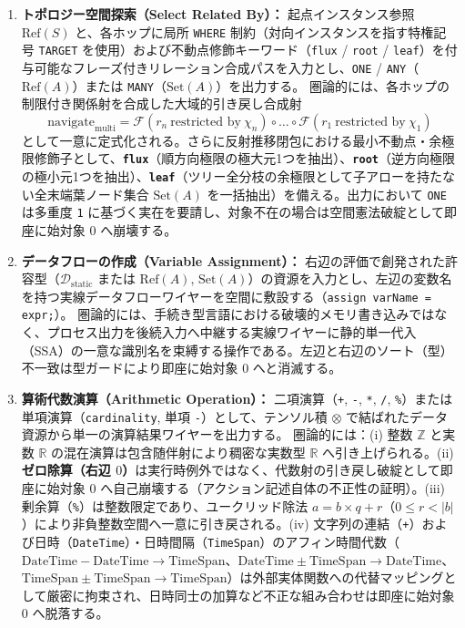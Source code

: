 \documentclass[11pt,a4paper]{ltjsarticle}
\theoremstyle{definition}
\theoremstyle{plain}
\theoremstyle{remark}
\newcommand{\Dstatic}{\mathcal{D}_{\mathrm{static}}}
\begin{document}
\begin{enumerate}[label=\textbf{(\arabic*)}, leftmargin=*]
    \item \textbf{トポロジー空間探索（Select Related By）：}
    起点インスタンス参照 $\mathrm{Ref}(S)$ と、各ホップに局所 \texttt{WHERE} 制約（対向インスタンスを指す特権記号 \texttt{TARGET} を使用）および不動点修飾キーワード（\texttt{flux} / \texttt{root} / \texttt{leaf}）を付与可能なフレーズ付きリレーション合成パスを入力とし、\texttt{ONE} / \texttt{ANY}（$\mathrm{Ref}(A)$）または \texttt{MANY}（$\mathrm{Set}(A)$）を出力する。
    圏論的には、各ホップの制限付き関係射を合成した大域的引き戻し合成射
    \begin{equation}
    \mathrm{navigate}_{\mathrm{multi}} = \mathcal{F}(r_n \ \text{restricted by} \ \chi_n) \circ \dots \circ \mathcal{F}(r_1 \ \text{restricted by} \ \chi_1)
    \end{equation}
    として一意に定式化される。さらに反射推移閉包における最小不動点・余極限修飾子として、\textbf{\texttt{flux}}（順方向極限の極大元1つを抽出）、\textbf{\texttt{root}}（逆方向極限の極小元1つを抽出）、\textbf{\texttt{leaf}}（ツリー全分枝の余極限として子アローを持たない全末端葉ノード集合 $\mathrm{Set}(A)$ を一括抽出）を備える。出力において \texttt{ONE} は多重度 \texttt{1} に基づく実在を要請し、対象不在の場合は空間憲法破綻として即座に始対象 $0$ へ崩壊する。
    \item \textbf{データフローの作成（Variable Assignment）：}
    右辺の評価で創発された許容型（$\Dstatic$ または $\mathrm{Ref}(A),\, \mathrm{Set}(A)$）の資源を入力とし、左辺の変数名を持つ実線データフローワイヤーを空間に敷設する（\texttt{assign varName = expr;}）。
    圏論的には、手続き型言語における破壊的メモリ書き込みではなく、プロセス出力を後続入力へ中継する実線ワイヤーに静的単一代入（SSA）の一意な識別名を束縛する操作である。左辺と右辺のソート（型）不一致は型ガードにより即座に始対象 $0$ へと消滅する。

    \item \textbf{算術代数演算（Arithmetic Operation）：}
    二項演算（\texttt{+}, \texttt{-}, \texttt{*}, \texttt{/}, \texttt{\%}）または単項演算（\texttt{cardinality}, 単項 \texttt{-}）として、テンソル積 $\otimes$ で結ばれたデータ資源から単一の演算結果ワイヤーを出力する。
    圏論的には：(i) 整数 $\mathbb{Z}$ と実数 $\mathbb{R}$ の混在演算は包含随伴射により稠密な実数型 $\mathbb{R}$ へ引き上げられる。(ii) \textbf{ゼロ除算（右辺 $0$）}は実行時例外ではなく、代数射の引き戻し破綻として即座に始対象 $0$ へ自己崩壊する（アクション記述自体の不正性の証明）。(iii) 剰余算（\texttt{\%}）は整数限定であり、ユークリッド除法 $a = b \times q + r$（$0 \le r < \lvert b \rvert$）により非負整数空間へ一意に引き戻される。(iv) 文字列の連結（\texttt{+}）および日時（\texttt{DateTime}）・日時間隔（\texttt{TimeSpan}）のアフィン時間代数（$\mathrm{DateTime} - \mathrm{DateTime} \to \mathrm{TimeSpan}$、$\mathrm{DateTime} \pm \mathrm{TimeSpan} \to \mathrm{DateTime}$、$\mathrm{TimeSpan} \pm \mathrm{TimeSpan} \to \mathrm{TimeSpan}$）は外部実体関数への代替マッピングとして厳密に拘束され、日時同士の加算など不正な組み合わせは即座に始対象 $0$ へ脱落する。


\end{enumerate}
\end{document}
